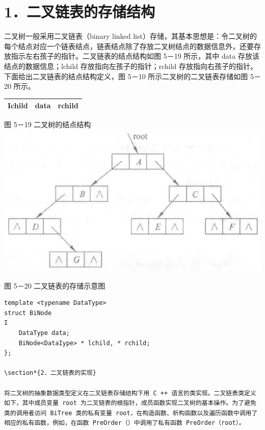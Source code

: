 \documentclass[10pt]{article}
\begin{document}
\section*{1．二叉链表的存储结构}
二叉树一般采用二叉链表（binary linked list）存储，其基本思想是：令二叉树的每个结点对应一个链表结点，链表结点除了存放二叉树结点的数据信息外，还要存放指示左右孩子的指针。二叉链表的结点结构如图 5－19 所示，其中 data 存放该结点的数据信息；lchild 存放指向左孩子的指针；rchild 存放指向右孩子的指针。下面给出二叉链表的结点结构定义，图 5－10 所示二叉树的二叉链表存储如图 5－20 所示。

\begin{center}
\begin{tabular}{|l|l|l|}
\hline
Ichild & data & rchild \\
\hline
\end{tabular}
\end{center}

图 5－19 二叉树的结点结构\\
\includegraphics[max width=\textwidth, center]{2025_06_06_704745ea57b15b2333e5g-154(1)}

图 5－20 二叉链表的存储示意图

\begin{verbatim}
template <typename DataType>
struct BiNode
I
    DataType data;
    BiNode<DataIype> * lchild, * rchild;
};

\section*{2．二叉链表的实现}

将二叉树的抽象数据类型定义在二叉链表存储结构下用 C ++ 语言的类实现。二叉链表类定义如下，其中成员变量 root 为二叉链表的根指针，成员函数实现二叉树的基本操作。为了避免类的调用者访问 BiTree 类的私有变量 root，在构造函数、析构函数以及遍历函数中调用了相应的私有函数，例如，在函数 PreOrder（）中调用了私有函数 PreOrder（root）。
\end{verbatim}
\end{document}
